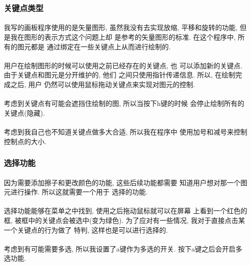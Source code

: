 \documentclass{article}
\begin{document}
		\subsubsection{关键点类型}
			\paragraph{}
				我写的画板程序使用的是矢量图形, 虽然我没有去实现放缩,
				平移和旋转的功能, 但是我在图形的表示方式这个问题上却
				是参考的矢量图形的标准. 在这个程序中, 所有的图元都是
				通过绑定在一些关键点上从而进行绘制的. 
			\paragraph{}
				用户在绘制图形的时候可以使用之前已经存在的关键点, 也
				可以添加新的关键点. 由于关键点和图元是分开维护的, 他们
				之间只使用指针传递信息. 所以, 在绘制完成之后, 用户
				仍然可以使用鼠标拖动关键点来实现对图元的控制.
			\paragraph{}
				考虑到关键点有可能会遮挡住绘制的图, 所以当按下h键的时候
				会停止绘制所有的关键点(隐藏).
			\paragraph{}
				考虑到我自己也不知道关键点做多大合适, 所以我在程序中
				使用加号和减号来控制控制点的大小.
		\subsubsection{选择功能}
			\paragraph{}
				因为需要添加擦子和更改颜色的功能, 这些后续功能都需要
				知道用户想对那一个图元进行操作. 所以这就需要一个用于
				选择的功能. 
			\paragraph{}
				选择功能能够在菜单之中找到, 使用之后拖动鼠标就可以在屏幕
				上看到一个红色的框, 被框中的关键点会被选中(变为绿色).
				为了应对有一些情况, 我对于直接点击某一个关键点的行为做了
				特判, 这样也是可以进行选择的.
			\paragraph{}
				考虑到有可能需要多选, 所以我设置了a键作为多选的开关.
				按下a键之后会开启多选功能.
\end{document}
